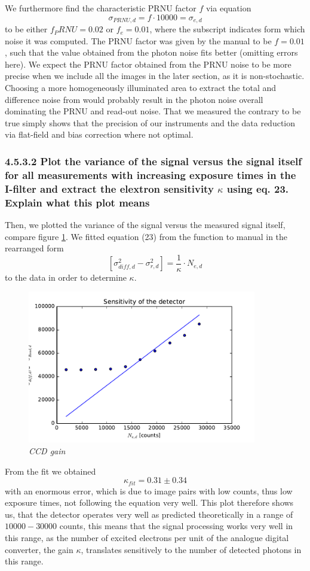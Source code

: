 We furthermore find the characteristic PRNU factor $f$ via equation 
\[\sigma_{PRNU,d} = f \cdot 10000 = \sigma_{e,d}\]  
to be either $f_PRNU = 0.02$ or $f_e = 0.01$, where the subscript indicates form which noise it was computed.
The PRNU factor was given by the manual to be $f=0.01$, such that the value obtained from the photon noise fits better (omitting errors here). We expect the PRNU factor obtained from the PRNU noise to be more precise when we include all the images in the later section, as it is non-stochastic. Choosing a more homogeneously illuminated area to extract the total and difference noise from would probably result in the photon noise overall dominating the PRNU and read-out noise. That we measured the contrary to be true simply shows that the precision of our instruments and the data reduction via flat-field and bias correction where not optimal.\\


\subsubsection{4.5.3.2 Plot the variance of the signal versus the signal itself for all measurements with increasing exposure times in the I-filter and extract the elextron sensitivity $\kappa$ using eq. 23. Explain what this plot means}
 
  Then, we plotted the variance of the signal versus the measured signal itself, compare figure \ref{fig:Abbildung 8}. We fitted equation (23) from the function to manual in the rearranged form 
  \begin{equation}
  	\left[\sigma_{diff,d}^{2}-\sigma_{r,d}^{2}\right] = \frac{1}{\kappa} \cdot N_{e,d}
  \end{equation}  
  to the data in order to determine $\kappa$. 
\begin{figure}[h]
	\includegraphics[width=100mm]{sensitivity}
	\centering
	\caption{ \itshape CCD gain  }
	\label{fig:Abbildung 8}
\end{figure}
\noindent
From the fit we obtained 
\[\kappa _{fit} = 0.31 \pm 0.34 \]
\noindent
with an enormous error, which is due to image pairs with low counts, thus low exposure times, not following the equation very well.
This plot therefore shows us, that the detector operates very well as predicted theoretically in a range of 
$10000-30000$ counts, this means that the signal processing works very well in this range, as the number of excited electrons per unit of the analogue digital converter, the gain $\kappa$, translates sensitively to the number of detected photons in this range.

